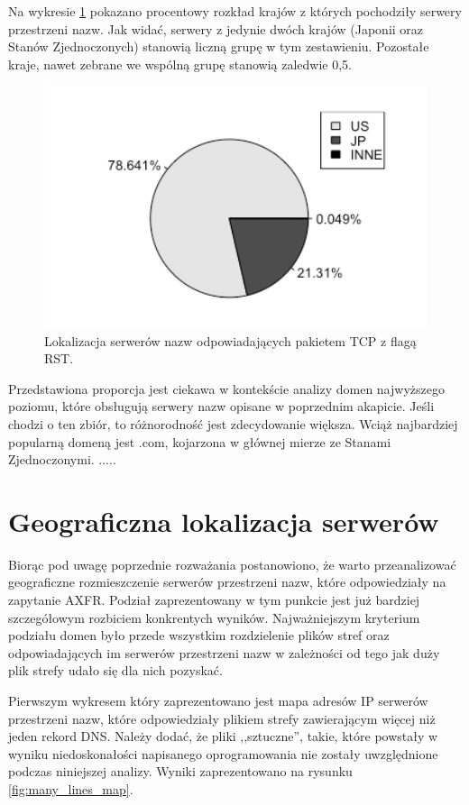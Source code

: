 Na wykresie \ref{fig:unused_pie} pokazano procentowy rozkład krajów z których pochodziły serwery przestrzeni nazw. Jak widać,
serwery z jedynie dwóch krajów (Japonii oraz Stanów Zjednoczonych) stanowią liczną grupę w tym zestawieniu. Pozostałe kraje, nawet
zebrane we wspólną grupę stanowią zaledwie 0,5\textperthousand.

\begin{figure}[h]
\centering
\includegraphics[width=1.0\textwidth]{image/unused_pie_no_title}
\caption{Lokalizacja serwerów nazw odpowiadających pakietem TCP z flagą RST.}
\label{fig:unused_pie}
\end{figure}

Przedstawiona proporcja jest ciekawa w kontekście analizy domen najwyższego poziomu, które obsługują serwery nazw opisane
w poprzednim akapicie. Jeśli chodzi o ten zbiór, to różnorodność jest zdecydowanie większa. Wciąż najbardziej popularną domeną
jest .com, kojarzona w głównej mierze ze Stanami Zjednoczonymi. .....

\section{Geograficzna lokalizacja serwerów}
Biorąc pod uwagę poprzednie rozważania postanowiono, że warto przeanalizować geograficzne rozmieszczenie serwerów przestrzeni nazw,
które odpowiedziały na zapytanie AXFR. Podział zaprezentowany w tym punkcie jest już bardziej szczegółowym rozbiciem konkrentych
wyników. Najważniejszym kryterium podziału domen było przede wszystkim rozdzielenie plików stref oraz odpowiadających im serwerów
przestrzeni nazw w zależności od tego jak duży plik strefy udało się dla nich pozyskać.

Pierwszym wykresem który zaprezentowano jest mapa adresów IP serwerów przestrzeni nazw, które odpowiedziały plikiem strefy zawierającym
więcej niż jeden rekord DNS. Należy dodać, że pliki ,,sztuczne'', takie, które powstały w wyniku niedoskonałości napisanego oprogramowania
nie zostały uwzględnione podczas niniejszej analizy. Wyniki zaprezentowano na rysunku \ref{fig:many_lines_map}.

